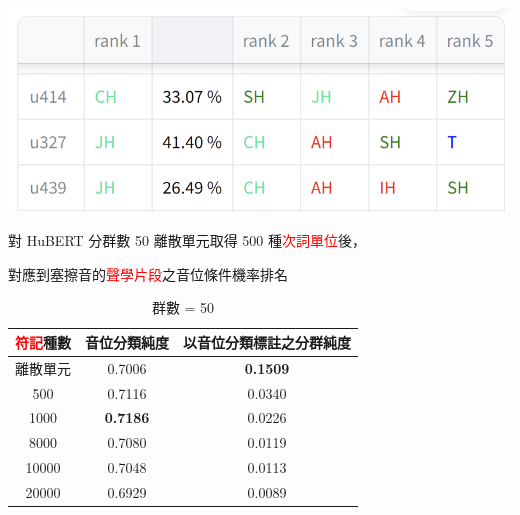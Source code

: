     {
        \begin{table}
            \centering
            \includegraphics[width=0.8\linewidth]{figures/ch4figs/aff-hub50-500.png}
            \caption{對 HuBERT 分群數 50 離散單元取得 500 種\textcolor{red}{次詞單位}後，}
            對應到塞擦音的\textcolor{red}{聲學片段}之音位條件機率排名
            \label{tabfig:aff}
        \end{table}

        \begin{table}[!htbp]
            \centering

            \begin{subtable}[t]{\textwidth}
                \centering
                \begin{tabular}{|c|c|c|} \hline
                    \textcolor{red}{符記}種數  & 音位分類純度    & 以音位分類標註之分群純度    \\ \hline
                                     離散單元  &         0.7006  &            \textbf{0.1509}  \\ \hline
                                         500   &         0.7116  &                    0.0340   \\ \hline
                                        1000   & \textbf{0.7186} &                    0.0226   \\ \hline
                                        8000   &         0.7080  &                    0.0119   \\ \hline
                                       10000   &         0.7048  &                    0.0113   \\ \hline
                                       20000   &         0.6929  &                    0.0089   \\ \hline
                \end{tabular}
                \caption{群數 = 50}
                \label{subtab:ch4-new-hubert-pcls-clu050}
            \end{subtable}

            \vfill


\end{table}}
